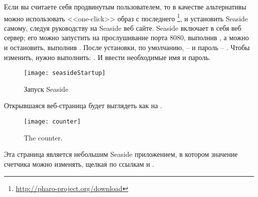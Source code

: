 \documentclass[a4paper,10pt,twoside]{book}
\begin{document}
Если вы считаете себя продвинутым пользователем,
то в качестве альтернативы можно использовать <<one-click>> образ
с последнего \footnote{\url{http://pharo-project.org/download}},
и установить Seaside самому, следуя руководству
 на Seaside веб сайте.
Seaside включает в себя веб сервер;
его можно запустить на прослушивание порта 8080,
выполнив  ,
а можно и остановить, выполнив .
После установки, по умолчанию,
 --  и пароль -- .
Чтобы изменить, нужно выполнить:  .
И ввести необходимые имя и пароль.


\begin{figure}[tbh]
\begin{center}
\texttt{[image: seasideStartup]}

\caption{Запуск Seaside}

\end{center}
\end{figure}


\noindent
Открывшаяся веб-страница будет выглядеть как на .

\noindent

\begin{figure}[htb]
\begin{center}
\texttt{[image: counter]}
\caption{The counter.}
\end{center}
\end{figure}

\noindent

Эта страница является небольшим Seaside приложением,
в котором значение счетчика можно изменять,
щелкая по ссылкам \link{++} и \link{--}.
\end{document}
